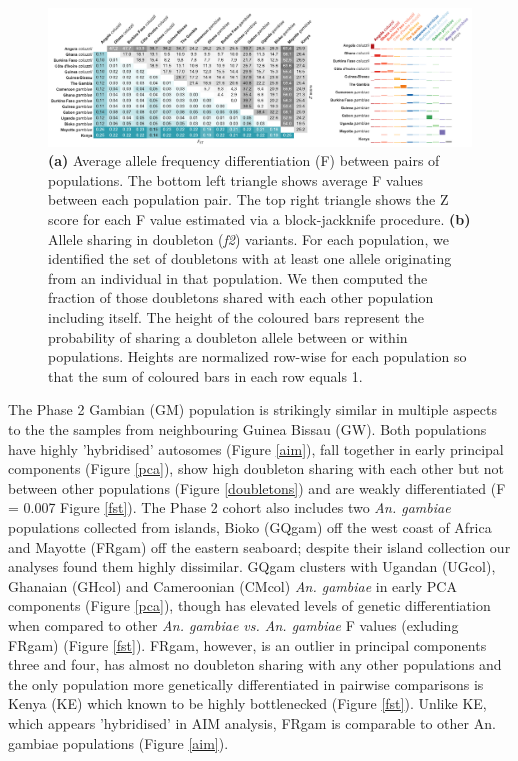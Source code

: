 \documentclass[a4paper,11pt,abstracton,hidelinks]{scrartcl}
\begin{document}
\begin{figure}[H]
	\begin{center}
		\includegraphics*[width=6.3in]{artwork/structure_composite.pdf}
	\end{center}
	\caption{\textbf{(a)} Average allele frequency differentiation (F) between pairs of populations. The bottom left triangle shows average F values between each population pair. The top right triangle shows the Z score for each F value estimated via a block-jackknife procedure. \textbf{(b)} Allele sharing in doubleton (\textit{f2}) variants. For each population, we identified the set of doubletons with at least one allele originating from an individual in that population. We then computed the fraction of those doubletons shared with each other population including itself. The height of the coloured bars represent the probability of sharing a doubleton allele between or within populations. Heights are normalized row-wise for each population so that the sum of coloured bars in each row equals 1.
}
	\label{fstdbl}
\end{figure}



%
The Phase 2 Gambian (GM) population is strikingly similar in multiple aspects to the the samples from neighbouring Guinea Bissau (GW).
%
Both populations have highly 'hybridised' autosomes (Figure \ref{aim}), fall together in early principal components (Figure \ref{pca}), show high doubleton sharing with each other but not between other populations (Figure \ref{doubletons}) and are weakly differentiated (F = 0.007 Figure \ref{fst}).
%
The Phase 2 cohort also includes two \textit{An. gambiae} populations collected from islands, Bioko (GQgam) off the west coast of Africa and Mayotte (FRgam) off the eastern seaboard; despite their island collection our analyses found them highly dissimilar. 
%
GQgam clusters with Ugandan (UGcol), Ghanaian (GHcol) and Cameroonian (CMcol) \textit{An. gambiae} in early PCA components (Figure \ref{pca}), though has elevated levels of genetic differentiation when compared to other 
\textit{An. gambiae vs. An. gambiae} F values (exluding FRgam) (Figure \ref{fst}). 
%
FRgam, however, is an outlier in principal components three and four, has almost no doubleton sharing with any other populations and the only population more genetically differentiated in pairwise comparisons is Kenya (KE) which known to be highly bottlenecked \cite{Ag1000gConsortium2017} (Figure \ref{fst}).
% 
Unlike KE, which appears 'hybridised' in AIM analysis, FRgam is comparable to other An. gambiae populations (Figure \ref{aim}).
\end{document}

